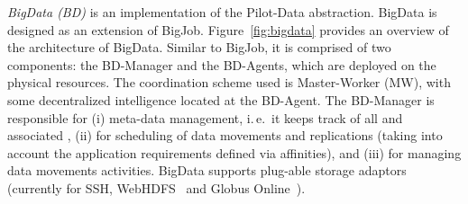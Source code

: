 \documentclass[conference]{IEEEtran}
\begin{document}

% 

{\it BigData (BD)} is an implementation of the Pilot-Data abstraction. BigData
is designed as an extension of BigJob. Figure~\ref{fig:bigdata}
provides an overview of the architecture of BigData. Similar to BigJob, it is
comprised of two components: the BD-Manager and the BD-Agents, which are
deployed on the physical resources. The coordination scheme used is
Master-Worker (MW), with some decentralized intelligence located at the
BD-Agent. The BD-Manager is responsible for (i) meta-data management, i.\,e.\
it keeps track of all \pd and associated \dus, (ii) for scheduling of data
movements and replications (taking into account the application requirements
defined via affinities), and (iii) for managing data movements activities.
BigData supports plug-able storage adaptors (currently for SSH,
WebHDFS~\cite{webhdfs} and Globus Online~\cite{10.1109/MIC.2011.64}).



\end{document}
